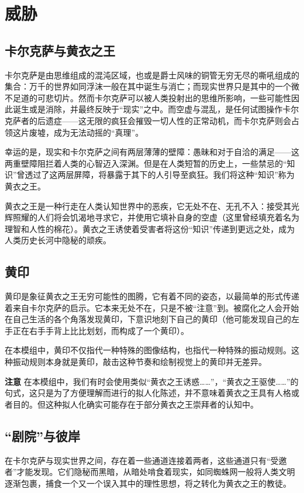 \section{威胁}

\subsection{卡尔克萨与黄衣之王}

卡尔克萨是由思维组成的混沌区域，也或是爵士风味的铜管无穷无尽的嘶吼组成的集合：万千的世界如同浮沫一般在其中诞生与消亡；而现实世界只是其中的一个微不足道的可悲切片。然而卡尔克萨可以被人类投射出的思维所影响，一些可能性因此诞生或是消除，并最终反映于“现实”之中。而空虚与混乱，是任何试图操作卡尔克萨者的后遗症——这无限的疯狂会摧毁一切人性的正常动机，而卡尔克萨则会占领这片废墟，成为无法动摇的“真理”。

幸运的是，现实和卡尔克萨之间有两层薄薄的壁障：愚昧和对于自洽的满足——这两重壁障阻拦着人类的心智迈入深渊。但是在人类短暂的历史上，一些禁忌的“知识”曾透过了这两层屏障，将暴露于其下的人引导至疯狂。我们将这种“知识”称为黄衣之王。

黄衣之王是一种行走在人类认知世界中的恶疾，它无处不在、无孔不入：接受其光辉照耀的人们将会饥渴地寻求它，并使用它填补自身的空虚（这里曾经填充着名为理智和人性的棉花）。黄衣之王诱使着受害者将这份“知识”传递到更远之处，成为人类历史长河中隐秘的顽疾。

\subsection{黄印}
黄印是象征黄衣之王无穷可能性的图腾，它有着不同的姿态，以最简单的形式传递着来自卡尔克萨的启示。它本来无处不在，只是不被“注意”到。被腐化之人会开始在自己生活的各个角落发现黄印，下意识地刻下自己的黄印（他可能发现自己的左手正在右手手背上比比划划，而构成了一个黄印）。

在本模组中，黄印不仅指代一种特殊的图像结构，也指代一种特殊的振动规则。这种振动规则本身就是黄印，敲击这种节奏和绘制视觉上的黄印并无差异。

\textbf{注意}
在本模组中，我们有时会使用类似“黄衣之王诱惑……”，“黄衣之王驱使……”的句式，这只是为了方便理解而进行的拟人化陈述，并不意味着黄衣之王具有人格或者目的。但这种拟人化确实可能存在于部分黄衣之王崇拜者的认知中。

\subsection{“剧院”与彼岸}
在卡尔克萨与现实世界之间，存在着一些通道连接着两者，这些通道只有“受邀者”才能发现。它们隐秘而黑暗，从暗处啃食着现实，如同蜘蛛网一般将人类文明逐渐包裹，捕食一个又一个误入其中的理性思想，将之转化为黄衣之王的教徒。

